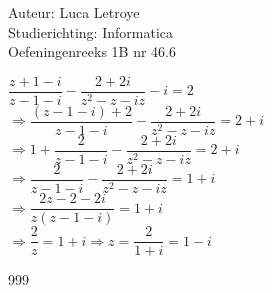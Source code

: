 \documentclass[a4paper]{article}
\begin{document}
  
\noindent \large Auteur: Luca Letroye \\
\noindent \large Studierichting: Informatica\\
\noindent \large Oefeningenreeks 1B nr 46.6\\

\medskip

\normalsize

$\dfrac{z+1-i}{z-1-i} - \dfrac{2+2i}{z^2-z-iz} - i = 2 $\\

$\Rightarrow \dfrac{(z-1-i)+2}{z-1-i} - \dfrac{2+2i}{z^2-z-iz} = 2 + i $\\

$\Rightarrow 1+ \dfrac{2}{z-1-i} - \dfrac{2+2i}{z^2-z-iz} = 2 + i $\\

$\Rightarrow \dfrac{2}{z-1-i} - \dfrac{2+2i}{z^2-z-iz} = 1 + i $\\

$\Rightarrow \dfrac{2z-2-2i}{z(z-1-i)} = 1 + i $\\

$\Rightarrow \dfrac{2}{z} = 1 + i  \Rightarrow z = \dfrac{2}{1+i} = 1-i$\\



\begin{thebibliography}{999}
\end{thebibliography}
\end{document}
